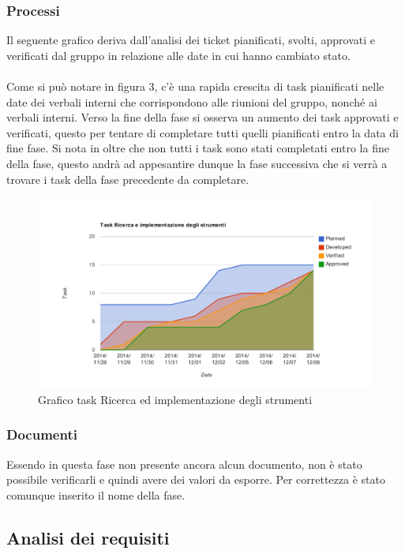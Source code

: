 		\subsubsection{Processi}
		Il seguente grafico deriva dall'analisi dei ticket pianificati, svolti, approvati e verificati dal gruppo in relazione alle date in cui hanno cambiato stato. \\ \\
		Come si può notare in figura 3, c'è una rapida crescita di task pianificati nelle date dei verbali interni che corrispondono alle riunioni del gruppo, nonché ai verbali interni. Verso la fine della fase si osserva un aumento dei task approvati e verificati, questo per tentare di completare tutti quelli pianificati entro la data di fine fase. Si nota in oltre che non tutti i task sono stati completati entro la fine della fase, questo andrà ad appesantire dunque la fase successiva che si verrà a trovare i task della fase precedente da completare.
			\begin{figure}[htbp]
				\centering
				\centerline{\includegraphics[scale=1]{images/Grafico_fase_1.pdf}}
				\caption{Grafico task Ricerca ed implementazione degli strumenti}
				\label{fig:taskfase1}
			\end{figure}
		\subsubsection{Documenti}
		Essendo in questa fase non presente ancora alcun documento, non è stato possibile verificarli e quindi avere dei valori da esporre. Per correttezza è stato comunque inserito il nome della fase.
	
	\subsection{Analisi dei requisiti}
